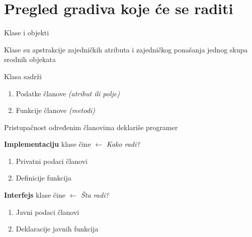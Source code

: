 \documentclass{article}
\newenvironment{xitemize}{%
    
    \itemize
    \larger
}{%
    \enditemize
}
\let\olditemize\itemize
\let\endolditemize\enditemize
\renewenvironment{itemize}{%
    \smaller
    \olditemize
}{%
    \endolditemize
}
\begin{document}
\section{Pregled gradiva koje će se raditi}
\begin{xitemize}
    \item Klase i objekti
    \begin{itemize}
        \item Klase su apstrakcije zajedničkih atributa i zajedničkog ponašanja jednog skupa srodnih objekata
        \item Klasa sadrži
        \begin{enumerate}
            \item Podatke članove \textit{(atribut ili polje)}
            \item Funkcije članove \textit{(metodi)}
        \end{enumerate}
        \item Pristupačnost određenim članovima deklariše programer
        \item \textbf{Implementaciju} klase čine $\longleftarrow$ \textit{Kako radi?}
        \begin{enumerate}
            \item Privatni podaci članovi
            \item Definicije funkcija
        \end{enumerate}
        \item \textbf{Interfejs} klase čine $\longleftarrow$ \textit{Šta radi?}
        \begin{enumerate}
            \item Javni podaci članovi
            \item Deklaracije javnih funkcija 
        \end{enumerate}


\end{itemize}
\end{xitemize}
\end{document}
